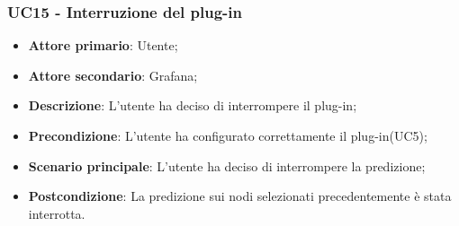 \subsubsection{UC15 - Interruzione del plug-in}
\label{sssec:uc15}
\begin{itemize}
  \item \textbf{Attore primario}: Utente;
  \item \textbf{Attore secondario}: Grafana;
  \item \textbf{Descrizione}: L'utente ha deciso di interrompere il plug-in;
  \item \textbf{Precondizione}: L'utente ha configurato correttamente il plug-in(UC5);
  \item \textbf{Scenario principale}: L'utente ha deciso di interrompere la predizione;
  \item \textbf{Postcondizione}: La predizione sui nodi selezionati precedentemente è stata interrotta.
\end{itemize}

